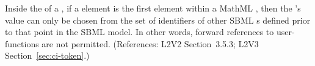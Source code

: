 Inside the  of a \FunctionDefinition, if a
 element is the first element within a MathML
, then the 's value can only be chosen from
the set of identifiers of other SBML \FunctionDefinition{}s
defined prior to that point in the SBML model.  In other words,
forward references to user-functions are not permitted.
(References: L2V2 Section~3.5.3; L2V3
Section~\ref{sec:ci-token}.)
